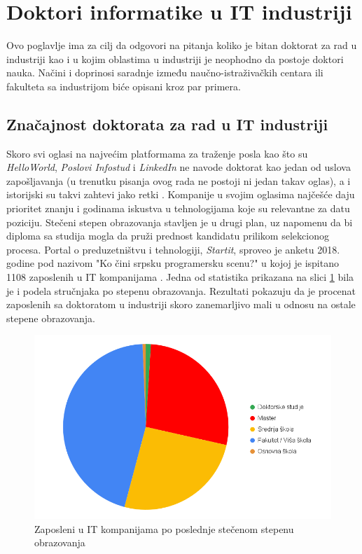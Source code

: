 \documentclass[a4paper]{article}
\begin{document}
\section{Doktori informatike u IT industriji}
\label{sec:industrija}

Ovo poglavlje ima za cilj da odgovori na pitanja koliko je bitan doktorat za rad u industriji kao i u kojim oblastima u industriji je neophodno da postoje doktori nauka. Načini i doprinosi saradnje između naučno-istraživačkih centara ili fakulteta sa industrijom biće opisani kroz par primera.

\subsection{Značajnost doktorata za rad u IT industriji}

Skoro svi oglasi na najvećim platformama za traženje posla kao što su \textit{HelloWorld}, \textit{Poslovi Infostud} i \textit{LinkedIn} ne navode doktorat kao jedan od uslova zapošljavanja (u trenutku pisanja ovog rada ne postoji ni jedan takav oglas), a i istorijski su takvi zahtevi jako retki \cite{zakogasudoktorske}. Kompanije u svojim oglasima najčešće daju prioritet znanju i godinama iskustva u tehnologijama koje su relevantne za datu poziciju. Stečeni stepen obrazovanja stavljen je u drugi plan, uz napomenu da bi diploma sa studija mogla da pruži prednost kandidatu prilikom selekcionog procesa.
 Portal o preduzetništvu i tehnologiji, \textit{Startit}, sproveo je anketu 2018. godine pod nazivom "Ko čini srpsku programersku scenu?" u kojoj je ispitano 1108 zaposlenih u IT kompanijama \cite{startit}. Jedna od statistika prikazana na slici \ref{fig:job-pie} bila je i podela stručnjaka po stepenu obrazovanja. Rezultati pokazuju da je procenat zaposlenih sa doktoratom u industriji skoro zanemarljivo mali u odnosu na ostale stepene obrazovanja.

\begin{figure}[h!]
\begin{center}
\includegraphics[scale=0.4]{PieChart.png}
\end{center}
\caption{Zaposleni u IT kompanijama po poslednje stečenom stepenu obrazovanja}
\label{fig:job-pie}
\end{figure}
\end{document}
